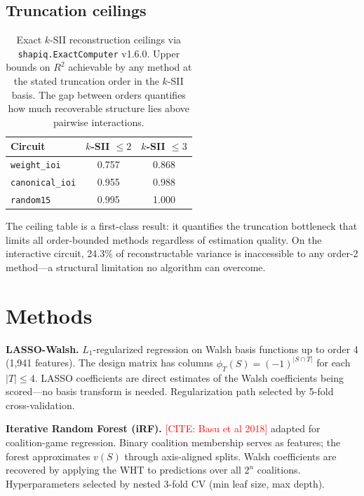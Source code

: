 \documentclass[11pt]{article}
\newcommand{\citeneeded}[1]{\textcolor{red}{[CITE: #1]}}
\begin{document}
\subsection{Truncation ceilings}
\label{sec:ceilings}

\begin{table}[t]
\centering
\caption{Exact $k$-SII reconstruction ceilings via
\texttt{shapiq.ExactComputer} v1.6.0. Upper bounds on $R^2$
achievable by any method at the stated truncation order in the
$k$-SII basis. The gap between orders quantifies how much
recoverable structure lies above pairwise interactions.}
\label{tab:ceilings}
\begin{tabular}{lcc}
\toprule
Circuit & $k$-SII $\leq 2$ & $k$-SII $\leq 3$ \\
\midrule
\texttt{weight\_ioi} & 0.757 & 0.868 \\
\texttt{canonical\_ioi} & 0.955 & 0.988 \\
\texttt{random15} & 0.995 & 1.000 \\
\bottomrule
\end{tabular}
\end{table}

The ceiling table is a first-class result: it quantifies the
truncation bottleneck that limits all order-bounded methods
regardless of estimation quality. On the interactive circuit,
24.3\% of reconstructable variance is inaccessible to any
order-2 method---a structural limitation no algorithm can overcome.


\section{Methods}
\label{sec:methods}

\textbf{LASSO-Walsh.}
$L_1$-regularized regression on Walsh basis functions up to order 4
(1{,}941 features). The design matrix has columns
$\phi_T(S) = (-1)^{|S \cap T|}$ for each $|T| \leq 4$. LASSO
coefficients are direct estimates of the Walsh coefficients being
scored---no basis transform is needed. Regularization path selected
by 5-fold cross-validation.

\textbf{Iterative Random Forest (iRF).}
\citeneeded{Basu et al 2018} adapted for coalition-game regression.
Binary coalition membership serves as features; the forest
approximates $v(S)$ through axis-aligned splits. Walsh coefficients
are recovered by applying the WHT to predictions over all $2^n$
coalitions. Hyperparameters selected by nested 3-fold CV (min leaf
size, max depth).
\end{document}
